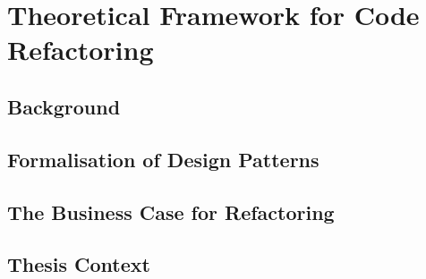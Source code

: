 \chapter{Theoretical Framework for Code Refactoring}

\section{Background}
\section{Formalisation of Design Patterns}
\section{The Business Case for Refactoring}
\section{Thesis Context}
